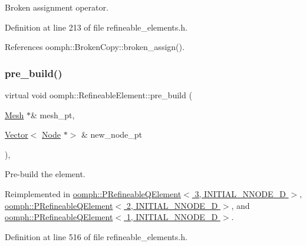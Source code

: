 Broken assignment operator. 



Definition at line 213 of file refineable\+\_\+elements.\+h.



References oomph\+::\+Broken\+Copy\+::broken\+\_\+assign().

\mbox{\label{classoomph_1_1RefineableElement_ab30d66018b994b03731e2942f6a15f36}} 
\subsubsection{\texorpdfstring{pre\+\_\+build()}{pre\_build()}}
{\footnotesize\ttfamily virtual void oomph\+::\+Refineable\+Element\+::pre\+\_\+build (\begin{DoxyParamCaption}\item[{\hyperlink{classoomph_1_1Mesh}{Mesh} $\ast$\&}]{mesh\+\_\+pt,  }\item[{\hyperlink{classoomph_1_1Vector}{Vector}$<$ \hyperlink{classoomph_1_1Node}{Node} $\ast$$>$ \&}]{new\+\_\+node\+\_\+pt }\end{DoxyParamCaption})\hspace{0.3cm}{\ttfamily [inline]}, {\ttfamily [virtual]}}



Pre-\/build the element. 



Reimplemented in \hyperlink{classoomph_1_1PRefineableQElement_3_013_00_01INITIAL__NNODE__1D_01_4_a774abc8e5c6c63abb2c702098d93002d}{oomph\+::\+P\+Refineable\+Q\+Element$<$ 3, I\+N\+I\+T\+I\+A\+L\+\_\+\+N\+N\+O\+D\+E\+\_\+D $>$}, \hyperlink{classoomph_1_1PRefineableQElement_3_012_00_01INITIAL__NNODE__1D_01_4_aef49b5dd3a1f2292ad4fb11f3367fcab}{oomph\+::\+P\+Refineable\+Q\+Element$<$ 2, I\+N\+I\+T\+I\+A\+L\+\_\+\+N\+N\+O\+D\+E\+\_\+D $>$}, and \hyperlink{classoomph_1_1PRefineableQElement_3_011_00_01INITIAL__NNODE__1D_01_4_aa0212960e79620a0d4cefbac9815f859}{oomph\+::\+P\+Refineable\+Q\+Element$<$ 1, I\+N\+I\+T\+I\+A\+L\+\_\+\+N\+N\+O\+D\+E\+\_\+D $>$}.



Definition at line 516 of file refineable\+\_\+elements.\+h.

\mbox{\label{classoomph_1_1RefineableElement_a33324be27833fa4b78279d17158215fa}} 

